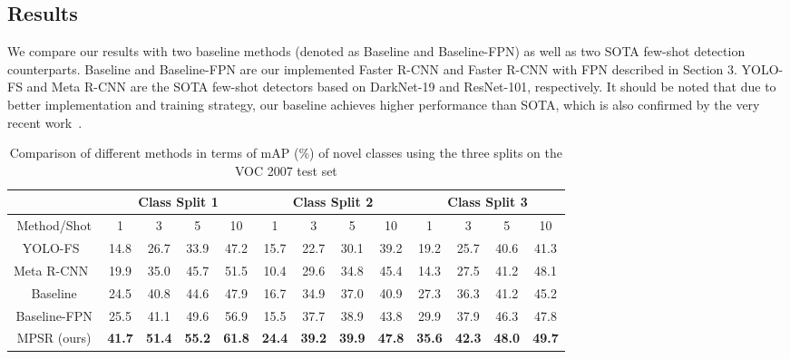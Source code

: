 \documentclass[runningheads]{llncs}
\begin{document}
\subsection{Results}

We compare our results with two baseline methods (denoted as Baseline and Baseline-FPN) as well as two SOTA few-shot detection counterparts. 
Baseline and Baseline-FPN are our implemented Faster R-CNN and Faster R-CNN with FPN described in Section 3.
YOLO-FS \cite{yolore} and Meta R-CNN \cite{metarcnn} are the SOTA few-shot detectors based on DarkNet-19 and ResNet-101, respectively.
It should be noted that due to better implementation and training strategy, our baseline achieves higher performance than SOTA, which is also confirmed by the very recent work~\cite{ftfsod}.

\setlength{\tabcolsep}{1.7pt}
\begin{table}
	\begin{center}
		\caption{Comparison of different methods in terms of mAP (\%) of novel classes using the three splits on the VOC 2007 test set}
		\label{table:mainvoctable}
		\begin{tabular}{c|cccc|cccc|cccc}
			\hline
			& \multicolumn{4}{c|}{Class Split 1}                            & \multicolumn{4}{c|}{Class Split 2}                            & \multicolumn{4}{c}{Class Split 3}                             \\ \hline
			Method/Shot  & 1             & 3             & 5             & 10            & 1             & 3             & 5             & 10            & 1             & 3             & 5             & 10            \\ \hline
			YOLO-FS~\cite{yolore}      & 14.8          & 26.7          & 33.9          & 47.2          & 15.7          & 22.7          & 30.1          & 39.2          & 19.2          & 25.7          & 40.6          & 41.3          \\
			Meta R-CNN~\cite{metarcnn}   & 19.9          & 35.0          & 45.7          & 51.5          & 10.4          & 29.6          & 34.8          & 45.4          & 14.3          & 27.5          & 41.2          & 48.1          \\ \hline
			Baseline     & 24.5          & 40.8          & 44.6          & 47.9          & 16.7          & 34.9          & 37.0          & 40.9          & 27.3          & 36.3          & 41.2          & 45.2          \\
			Baseline-FPN & 25.5          & 41.1          & 49.6          & 56.9          & 15.5          & 37.7          & 38.9          & 43.8          & 29.9          & 37.9          & 46.3          & 47.8          \\ \hline
			MPSR (ours)  & \textbf{41.7} & \textbf{51.4} & \textbf{55.2} & \textbf{61.8} & \textbf{24.4} & \textbf{39.2} & \textbf{39.9} & \textbf{47.8} & \textbf{35.6} & \textbf{42.3} & \textbf{48.0} & \textbf{49.7} \\ \hline
		\end{tabular}
	\end{center}
\end{table}
\setlength{\tabcolsep}{1.4pt}
\end{document}
